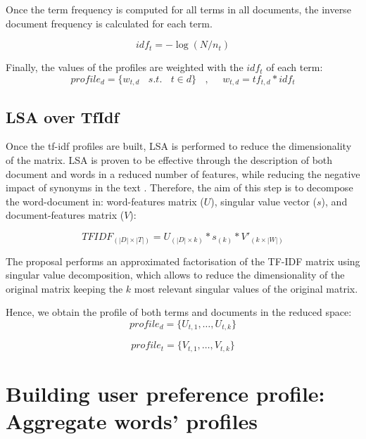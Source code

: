 \documentclass[preprint]{elsarticle}
\begin{document}
\begin{spacing}{2}
Once the term frequency is computed for all terms in all documents, the inverse document frequency is calculated for each term.

\begin{equation}
	idf_t = - \log( N / n_t )
\end{equation}

Finally, the values of the profiles are weighted with the $idf_t$ of each term:
\begin{equation}
	profile_d = \{w_{t,d} ~~~~s.t. ~~~~t\in d\} ~~~~,  ~~~~~~
	w_{t,d} = tf_{t,d}*idf_t
\end{equation}

\subsection{LSA over TfIdf}

Once the tf-idf profiles are built, LSA is performed to reduce the dimensionality of the matrix. LSA is proven to be effective through the description of both document and words in a reduced number of features, while reducing the negative impact of synonyms in the text \cite{}. Therefore, the aim of this step is to decompose the word-document in: word-features matrix ($U$), singular value vector ($s$), and document-features matrix ($V$):

\begin{equation}
	TFIDF_{(|D|\times|T|)} = U_{(|D|\times k)} * s_{(k)} * V'_{(k \times |W|)}
\end{equation}

The proposal performs an approximated factorisation of the TF-IDF matrix using singular value decomposition, which allows to reduce the dimensionality of the original matrix keeping the $k$ most relevant singular values of the original matrix.

Hence, we obtain the profile of both terms and documents in the reduced space:
\begin{equation}
	profile_d = \{ U_{t,1},\dots, U_{t,k}\}
\end{equation}

\begin{equation}
	profile_t = \{ V_{t,1},\dots, V_{t,k}\}
\end{equation}

\section{Building user preference profile: Aggregate words' profiles}


\end{spacing}
\end{document}
